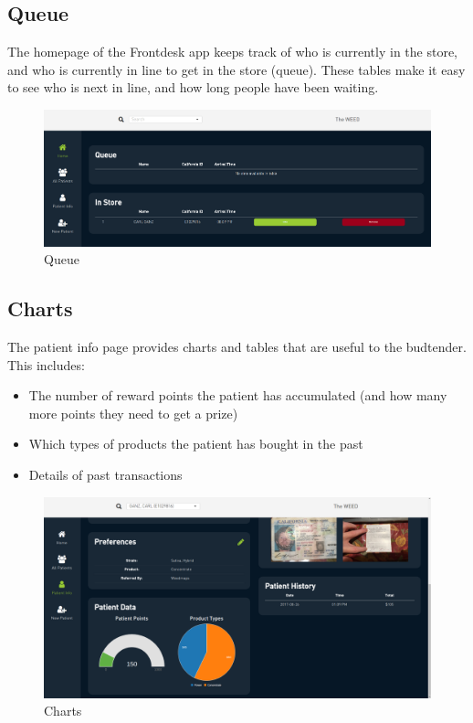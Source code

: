 \documentclass[]{book}
\theoremstyle{definition}
\theoremstyle{definition}
\theoremstyle{definition}
\theoremstyle{remark}
\begin{document}
\subsection{Queue}\label{queue}

The homepage of the Frontdesk app keeps track of who is currently in the
store, and who is currently in line to get in the store (queue). These
tables make it easy to see who is next in line, and how long people have
been waiting.

\begin{figure}
\centering
\includegraphics{images/FD2.png}
\caption{Queue}
\end{figure}

\subsection{Charts}\label{charts}

The patient info page provides charts and tables that are useful to the
budtender. This includes:

\begin{itemize}
\item
  The number of reward points the patient has accumulated (and how many
  more points they need to get a prize)
\item
  Which types of products the patient has bought in the past
\item
  Details of past transactions
\end{itemize}

\begin{figure}
\centering
\includegraphics{images/FD4.png}
\caption{Charts}
\end{figure}
\end{document}
